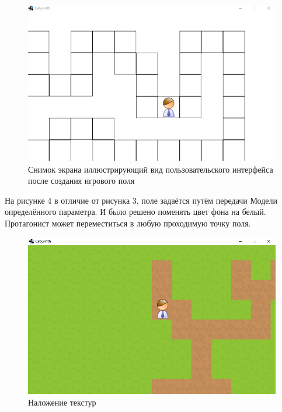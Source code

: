 \begin{figure}[H]
	\begin{center}
		\includegraphics[scale=0.7]{pics/02.png}
		\caption{Снимок экрана иллюстрирующий вид пользовательского интерфейса после создания игрового поля} 
		\label{pic:pic_name} %
	\end{center}
\end{figure}

На рисунке 4 в отличие от рисунка 3, поле задаётся путём передачи Модели определённого параметра. И было решено поменять цвет фона на белый. Протагонист может переместиться в любую проходимую точку поля.

\begin{figure}[H]
	\begin{center}
		\includegraphics[scale=0.7]{pics/03.png}
		\caption{Наложение текстур} 
		\label{pic:pic_name} %
	\end{center}
\end{figure}

